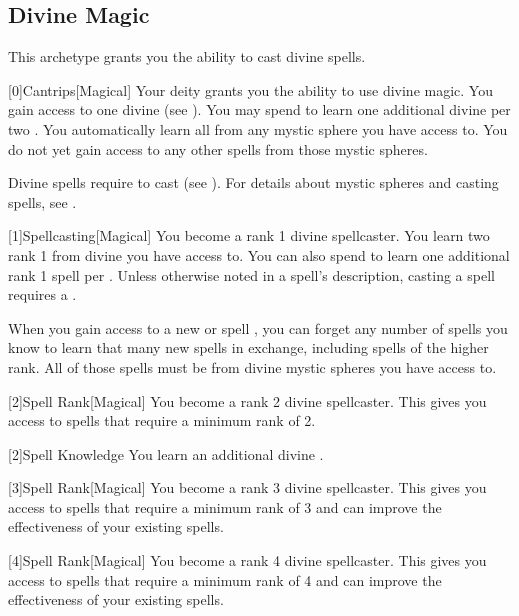     \newpage
    \subsection{Divine Magic}
        This archetype grants you the ability to cast divine spells.

        [0]{Cantrips}[Magical]
        Your deity grants you the ability to use divine magic.
        You gain access to one divine  (see ).
        You may spend  to learn one additional divine  per two .
        You automatically learn all  from any mystic sphere you have access to.
        You do not yet gain access to any other spells from those mystic spheres.

        Divine spells require  to cast (see ).
        For details about mystic spheres and casting spells, see .

        [1]{Spellcasting}[Magical]
        You become a rank 1 divine spellcaster.
        You learn two rank 1  from divine  you have access to.
        You can also spend  to learn one additional rank 1 spell per .
        Unless otherwise noted in a spell's description, casting a spell requires a .

        When you gain access to a new  or spell ,
            you can forget any number of spells you know to learn that many new spells in exchange,
            including spells of the higher rank.
        All of those spells must be from divine mystic spheres you have access to.

        [2]{Spell Rank}[Magical] You become a rank 2 divine spellcaster.
        This gives you access to spells that require a minimum rank of 2.

        [2]{Spell Knowledge} You learn an additional divine .

        [3]{Spell Rank}[Magical] You become a rank 3 divine spellcaster.
        This gives you access to spells that require a minimum rank of 3 and can improve the effectiveness of your existing spells.

        [4]{Spell Rank}[Magical] You become a rank 4 divine spellcaster.
        This gives you access to spells that require a minimum rank of 4 and can improve the effectiveness of your existing spells.

